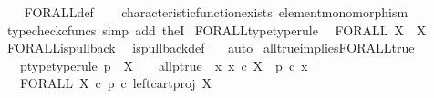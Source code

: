 \begin{isabellebody}
%
\isadelimproof
\ \ %
\endisadelimproof
%
\isatagproof
{}\isamarkupfalse%
\ FORALL{\isacharunderscore}{\kern0pt}def\isanewline
\ \ \isamarkupfalse%
\ characteristic{\isacharunderscore}{\kern0pt}function{\isacharunderscore}{\kern0pt}exists\ element{\isacharunderscore}{\kern0pt}monomorphism\isanewline
\ \ \isamarkupfalse%
\ {\isacharparenleft}{\kern0pt}typecheck{\isacharunderscore}{\kern0pt}cfuncs{\isacharcomma}{\kern0pt}\ simp\ add{\isacharcolon}{\kern0pt}\ the{}I{}{\isacharparenright}{\kern0pt}%
\endisatagproof
{\isafoldproof}%
%
\isadelimproof
\isanewline
%
\endisadelimproof
\isanewline
{}\isamarkupfalse%
\ FORALL{\isacharunderscore}{\kern0pt}type{\isacharbrackleft}{\kern0pt}type{\isacharunderscore}{\kern0pt}rule{\isacharbrackright}{\kern0pt}{\isacharcolon}{\kern0pt}\isanewline
\ \ {\isachardoublequoteopen}FORALL\ X\ {\isacharcolon}{\kern0pt}\ {\isasymOmega}\isactrlbsup X\isactrlesup \ {\isasymrightarrow}\ {\isasymOmega}{\isachardoublequoteclose}\isanewline
%
\isadelimproof
\ \ %
\endisadelimproof
%
\isatagproof
{}\isamarkupfalse%
\ FORALL{\isacharunderscore}{\kern0pt}is{\isacharunderscore}{\kern0pt}pullback\ \isamarkupfalse%
\ is{\isacharunderscore}{\kern0pt}pullback{\isacharunderscore}{\kern0pt}def\ \ \isamarkupfalse%
\ auto%
\endisatagproof
{\isafoldproof}%
%
\isadelimproof
\isanewline
%
\endisadelimproof
\isanewline
{}\isamarkupfalse%
\ all{\isacharunderscore}{\kern0pt}true{\isacharunderscore}{\kern0pt}implies{\isacharunderscore}{\kern0pt}FORALL{\isacharunderscore}{\kern0pt}true{\isacharcolon}{\kern0pt}\isanewline
\ \ \ p{\isacharunderscore}{\kern0pt}type{\isacharbrackleft}{\kern0pt}type{\isacharunderscore}{\kern0pt}rule{\isacharbrackright}{\kern0pt}{\isacharcolon}{\kern0pt}\ {\isachardoublequoteopen}p\ {\isacharcolon}{\kern0pt}\ X\ {\isasymrightarrow}\ {\isasymOmega}{\isachardoublequoteclose}\ \ all{\isacharunderscore}{\kern0pt}p{\isacharunderscore}{\kern0pt}true{\isacharcolon}{\kern0pt}\ {\isachardoublequoteopen}{\isasymAnd}\ x{\isachardot}{\kern0pt}\ x\ {\isasymin}\isactrlsub c\ X\ {\isasymLongrightarrow}\ p\ {\isasymcirc}\isactrlsub c\ x\ {\isacharequal}{\kern0pt}\ {\isasymt}{\isachardoublequoteclose}\isanewline
\ \ \ {\isachardoublequoteopen}FORALL\ X\ {\isasymcirc}\isactrlsub c\ {\isacharparenleft}{\kern0pt}p\ {\isasymcirc}\isactrlsub c\ left{\isacharunderscore}{\kern0pt}cart{\isacharunderscore}{\kern0pt}proj\ X\ {\isasymone}{\isacharparenright}{\kern0pt}\isactrlsup {\isasymsharp}\ {\isacharequal}{\kern0pt}\ {\isasymt}{\isachardoublequoteclose}\isanewline

\end{isabellebody}
